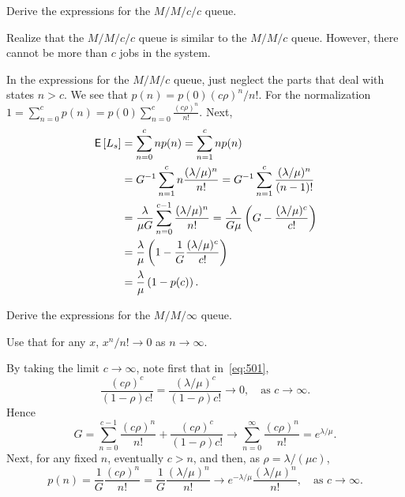 \begin{exercise}\label{ex:l-245}
Derive the expressions for the $M/M/c/c$ queue. 
\begin{hint}
  Realize that the $M/M/c/c$ queue is similar to the $M/M/c$ queue. However, there cannot be more than $c$ jobs in the system. 
\end{hint}
\begin{solution} 
In the expressions for the $M/M/c$ queue, just neglect the parts that deal with states $n>c$. 
We see that $p(n) = p(0)(c\rho)^n/{n!}$. For the normalization
$1=\sum_{n=0}^c p(n) = p(0) \sum_{n=0}^c \frac{(c\rho)^n}{n!}$. Next, 
 \begin{align*}
 \,\mathsf{E}\left[L_s\right] 
&= \sum_{n=0}^{c} n p(n) = \sum_{n=1}^c n p(n) \\
&= G^{-1} \sum_{n=1}^c n \frac{(\lambda/\mu)^n}{n!} 
= G^{-1} \sum_{n=1}^{c} \frac{(\lambda/\mu)^{n}}{(n-1)!} \\
&= \frac{\lambda}{\mu G} \sum_{n=0}^{c-1} \frac{(\lambda/\mu)^{n}}{n!} 
= \frac{\lambda}{G\mu} \left(G- \frac{(\lambda/\mu)^c}{c!}\right) \\
&= \frac{\lambda}{\mu} \left(1- \frac{1}G\frac{(\lambda/\mu)^c}{c!}\right) \\
&= \frac{\lambda}{\mu} \left(1- p(c)\right).
 \end{align*}
\end{solution}
\end{exercise}

\begin{exercise}\label{ex:l-246}
Derive the expressions for the $M/M/\infty$ queue. 
\begin{hint}
Use that for any $x$, $x^n/n!\to 0$ as $n\to\infty$.
\end{hint}
\begin{solution}
 By taking the limit $c\to\infty$, note first that in~\cref{eq:501},
\begin{equation*}
\frac{(c\rho)^c}{(1-\rho)c!} = \frac{(\lambda/\mu)^c}{(1-\rho)c!}\to 0, \quad\text{as } c\to \infty.
\end{equation*}
Hence
\begin{equation*}
G =\sum_{n=0}^{c-1} \frac{(c\rho)^n}{n!} + \frac{(c\rho)^c}{(1-\rho)c!} \to \sum_{n=0}^{\infty} \frac{(c\rho)^n}{n!} = e^{\lambda/\mu}.
\end{equation*}
Next, for any fixed $n$, eventually $c>n$, and then, as $\rho=\lambda/(\mu c)$, 
\begin{equation*}
 p(n) = \frac{1}G \frac{(c\rho)^n}{n!} = \frac{1}G \frac{(\lambda/\mu)^n}{n!} 
\to e^{-\lambda/\mu} \frac{(\lambda/\mu)^n}{n!}, \quad\text{as } c\to\infty.
\end{equation*}
\end{solution}
\end{exercise}





